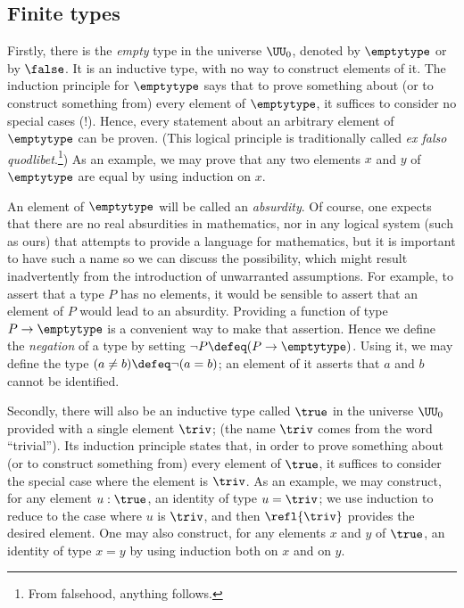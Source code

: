 \subsection{Finite types}
\label{sec:finite-types}
Firstly, there is the \emph{empty} type in the universe $\UU_0$, denoted by $\emptytype$ or by $\false$.  It is an inductive type, with no way
to construct elements of it.  The induction principle for $\emptytype$ says that to prove something about (or to construct something from) every
element of $\emptytype$, it suffices to consider no special cases (!).  Hence, every statement about an arbitrary element of $\emptytype$ can be
proven. (This logical principle is traditionally called \emph{ex falso quodlibet}.\footnote{%
From falsehood, anything follows.}) As an example, we may prove that any two elements $x$ and $y$ of $\emptytype$ are equal by using induction
on $x$.

An element of $\emptytype$ will be called an \emph{absurdity}.  Of course, one expects that there are no real absurdities in mathematics, nor in any
logical system (such as ours) that attempts to provide a language for mathematics, but it is important to have such a name so we can discuss
the possibility, which might result inadvertently from the introduction of unwarranted assumptions.  For example, to assert that a type $P$ has
no elements, it would be sensible to assert that an element of $P$ would lead to an absurdity.  Providing a function of type $P \to \emptytype$ is a
convenient way to make that assertion.  Hence we define the \emph{negation} of a type by setting $\neg P \defeq (P \to \emptytype)$.  Using it, we
may define the type $(a \ne b) \defeq \neg (a = b)$; an element of it asserts that $a$ and $b$ cannot be identified.

Secondly, there will also be an inductive type called $\true$ in the universe $\UU_0$ provided with a single element $\triv$; (the name $\triv$
comes from the word ``trivial'').  Its induction principle states that, in order to prove something about (or to construct something from) every
element of $\true$, it suffices to consider the special case where the element is $\triv$.  As an example, we may construct, for any element $u
: \true$, an identity of type $u=\triv$; we use induction to reduce to the case where $u$ is $\triv$, and then $\refl{\triv}$ provides the
desired element.  One may also construct, for any elements $x$ and $y$ of $\true$, an identity of type $x=y$ by using induction both on $x$ and
on $y$.

